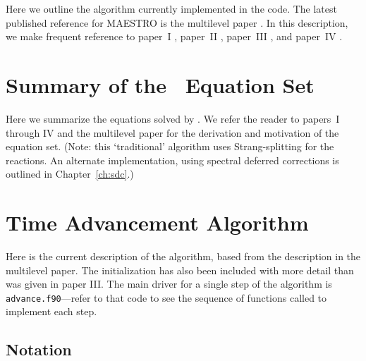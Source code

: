 Here we outline the algorithm currently implemented in the code.  The
latest published reference for MAESTRO is the multilevel
paper \cite{multilevel}.  In this description, we make frequent
reference to paper~I \cite{lowMach}, paper~II \cite{lowMach2},
paper~III \cite{lowMach3}, and paper~IV \cite{lowMach4}.





\section{Summary of the \maestro\ Equation Set}

Here we summarize the equations solved by \maestro.  We refer the reader
to papers~I through IV and the multilevel paper for the derivation
and motivation of the equation set.  (Note: this `traditional' algorithm
uses Strang-splitting for the reactions.  An alternate implementation, using
spectral deferred corrections is outlined in Chapter~\ref{ch:sdc}.)






\section{Time Advancement Algorithm}\label{Sec:Time Advancement Algorithm}
Here is the current description of the algorithm, based from the
description in the multilevel paper.  The initialization has also been
included with more detail than was given in paper III.  The main
driver for a single step of the algorithm is {\tt advance.f90}---refer
to that code to see the sequence of functions called to implement each
step.


\subsection{Notation}


